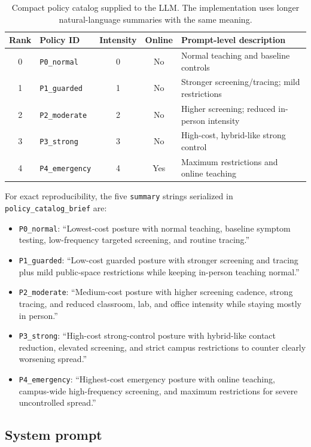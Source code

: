 \begin{table}[h]
\centering
\small
\begin{tabular}{clccl}
\hline
Rank & Policy ID & Intensity & Online & Prompt-level description \\
\hline
0 & \texttt{P0\_normal} & 0 & No & Normal teaching and baseline controls \\
1 & \texttt{P1\_guarded} & 1 & No & Stronger screening/tracing; mild restrictions \\
2 & \texttt{P2\_moderate} & 2 & No & Higher screening; reduced in-person intensity \\
3 & \texttt{P3\_strong} & 3 & No & High-cost, hybrid-like strong control \\
4 & \texttt{P4\_emergency} & 4 & Yes & Maximum restrictions and online teaching \\
\hline
\end{tabular}
\caption{Compact policy catalog supplied to the LLM.  The implementation uses
longer natural-language summaries with the same meaning.}
\label{tab:policy-catalog-brief}
\end{table}

For exact reproducibility, the five \texttt{summary} strings serialized in
\texttt{policy\_catalog\_brief} are:

\begin{itemize}
  \item \texttt{P0\_normal}: ``Lowest-cost posture with normal teaching,
  baseline symptom testing, low-frequency targeted screening, and routine
  tracing.''
  \item \texttt{P1\_guarded}: ``Low-cost guarded posture with stronger
  screening and tracing plus mild public-space restrictions while keeping
  in-person teaching normal.''
  \item \texttt{P2\_moderate}: ``Medium-cost posture with higher screening
  cadence, strong tracing, and reduced classroom, lab, and office intensity
  while staying mostly in person.''
  \item \texttt{P3\_strong}: ``High-cost strong-control posture with
  hybrid-like contact reduction, elevated screening, and strict campus
  restrictions to counter clearly worsening spread.''
  \item \texttt{P4\_emergency}: ``Highest-cost emergency posture with online
  teaching, campus-wide high-frequency screening, and maximum restrictions for
  severe uncontrolled spread.''
\end{itemize}

\subsection{System prompt}

